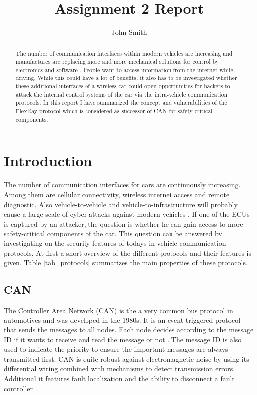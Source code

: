 \documentclass{latex4ei/latex4ei_report}		%
\title{Assignment 2 Report}
\author{John Smith}
\begin{document}
\maketitle

\begin{abstract}
    The number of communication interfaces within modern vehicles are increasing and manufactures are replacing more and more mechanical solutions for control by electronics and software \cite{alarm}.
    People want to access information from the internet while driving. While this could have a lot of benefits, it also has to be investigated whether these additional interfaces of a wireless car could open opportunities for hackers to attack the internal control systems of the car via the intra-vehicle communication protocols.
    In this report I have summarized the concept and vulnerabilities of the FlexRay protocol which is considered as successor of CAN for safety critical components. 
\end{abstract}
\vspace{1cm}


\section{Introduction}

The number of communication interfaces for cars are continuously increasing. Among them are cellular connectivity, wireless internet access and remote diagnostic. Also vehicle-to-vehicle and vehicle-to-infrastructure will probably cause a large scale of cyber attacks against modern vehicles \cite{safe}. If one of the ECUs is captured by an attacker, the question is whether he can gain access to more safety-critical components of the car. This question can be answered by investigating on the security features of todays in-vehicle communication protocols.
At first a short overview of the different protocols and their features is given. Table \ref{tab_protocols} summarizes the main properties of these protocols.

    \subsection{CAN}
    The Controller Area Network (CAN) is the a very common bus protocol in automotives and was developed in the 1980s. It is an event triggered protocol that sends the messages to all nodes. Each node decides according to the message ID if it wants to receive and read the message or not . The message ID is also used to indicate the priority to ensure the important messages are always transmitted first. CAN is quite robust against electromagnetic noise by using its differential wiring combined with mechanisms to detect transmission errors. Additional it features fault localization and the ability to disconnect a fault controller \cite{wolf}.
\end{document}
